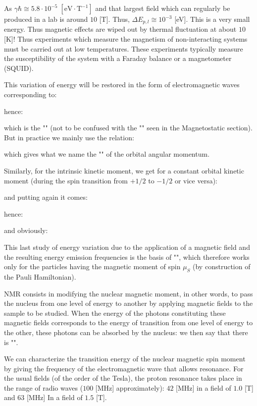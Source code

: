 	\begin{tcolorbox}[title=Remark,colframe=black,arc=10pt]
	As $\gamma\hbar\cong 5.8\cdot 10^{-5}\;[\text{eV}\cdot\text{T}^{-1}]$ and that largest field which can regularly be produced in a lab is around $10$ [T]. Thus, $\Delta E_{p,l}\cong 10^{-3}$ [eV]. This is a very small energy. Thus magnetic effects are wiped out by thermal fluctuation at about $10$ [K]! Thus experiments which measure the magnetism of non-interacting systems must be carried out at low temperatures. These experiments typically measure the susceptibility
of the system with a Faraday balance or a magnetometer (SQUID).
	\end{tcolorbox}
	This variation of energy will be restored in the form of electromagnetic waves corresponding to:
	
	hence:
	
	which is the "" (not to be confused with the "" seen in the Magnetostatic section). But in practice we mainly use the relation:
	
	which gives what we name the "" of the orbital angular momentum.
	
	Similarly, for the intrinsic kinetic moment, we get for a constant orbital kinetic moment (during the spin transition from $+1/2$ to $-1/2$ or vice versa):
	
	and putting again it comes:
	
	hence:
	
	and obviously:
	
	This last study of energy variation due to the application of a magnetic field and the resulting energy emission frequencies is the basis of "", which therefore works only for the particles having the magnetic moment of spin $\mu_S$ (by construction of the Pauli Hamiltonian).
	
	NMR consists in modifying the nuclear magnetic moment, in other words, to pass the nucleus from one level of energy to another by applying magnetic fields to the sample to be studied. When the energy of the photons constituting these magnetic fields corresponds to the energy of transition from one level of energy to the other, these photons can be absorbed by the nucleus: we then say that there is "".
	
	We can characterize the transition energy of the nuclear magnetic spin moment by giving the frequency of the electromagnetic wave that allows resonance. For the usual fields (of the order of the Tesla), the proton resonance takes place in the range of radio waves ($100$ [MHz] approximately): $42$ [MHz] in a field of $1.0$ [T] and $63$ [MHz] In a field of $1.5$ [T].
	
